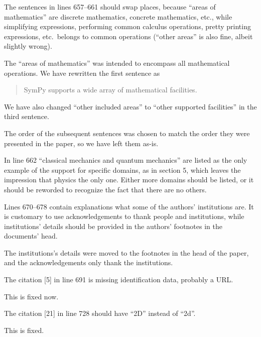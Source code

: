 \documentclass[answers,12pt]{exam}
\begin{document}
\begin{questions}
\question The sentences in lines 657--661 should swap places, because ``areas of mathematics'' are discrete mathematics, concrete mathematics, etc., while simplifying expressions, performing common calculus operations, pretty printing expressions, etc.\ belongs to common operations (``other areas'' is also fine, albeit slightly wrong).
\begin{solution}
The ``areas of mathematics'' was intended to encompass all mathematical
operations. We have rewritten the first sentence as
\begin{quote}
SymPy supports a wide array of mathematical facilities.
\end{quote}
We have also changed ``other included areas'' to ``other supported facilities'' in the third sentence.

The order of the subsequent sentences was chosen to match the order they were
presented in the paper, so we have left them as-is.
\end{solution}

\question In line 662 ``classical mechanics and quantum mechanics'' are listed as the only example of the support for specific domains, as in section 5, which leaves the impression that physics the only one. Either more domains should be listed, or it should be reworded to recognize the fact that there are no others.
\begin{solution}

\end{solution}

\question Lines 670--678 contain explanations what some of the authors' institutions are. It is customary to use acknowledgements to thank people and institutions, while institutions' details should be provided in the authors' footnotes in the documents' head.
\begin{solution}
The institutions's details were moved to the footnotes in the head of the
paper, and the acknowledgements only thank the institutions.
\end{solution}

\question The citation [5] in line 691 is missing identification data, probably a URL\@.
\begin{solution}
This is fixed now.
\end{solution}

\question The citation [21] in line 728 should have ``2D'' instead of ``2d''.
\begin{solution}
This is fixed.
\end{solution}


\end{questions}
\end{document}
